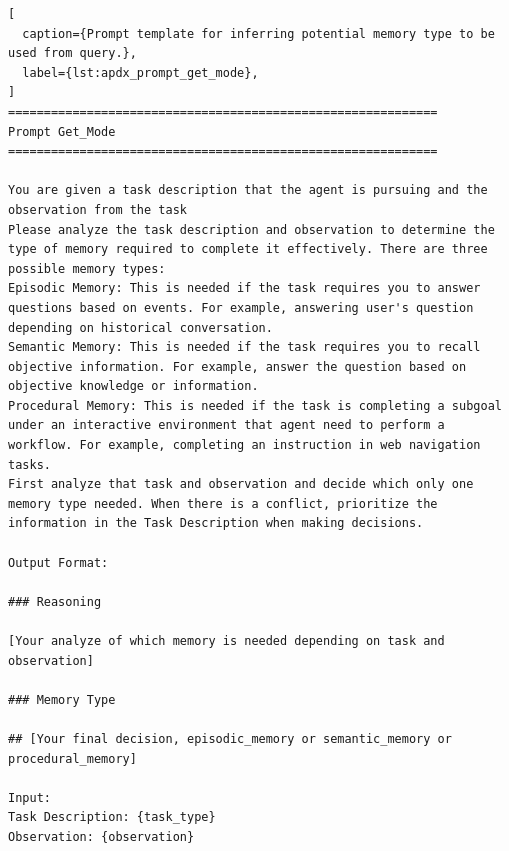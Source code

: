 \begin{lstlisting}[
  caption={Prompt template for inferring potential memory type to be used from query.},
  label={lst:apdx_prompt_get_mode},
]
============================================================
Prompt Get_Mode
============================================================

You are given a task description that the agent is pursuing and the observation from the task
Please analyze the task description and observation to determine the type of memory required to complete it effectively. There are three possible memory types:
Episodic Memory: This is needed if the task requires you to answer questions based on events. For example, answering user's question depending on historical conversation.
Semantic Memory: This is needed if the task requires you to recall objective information. For example, answer the question based on objective knowledge or information.
Procedural Memory: This is needed if the task is completing a subgoal under an interactive environment that agent need to perform a workflow. For example, completing an instruction in web navigation tasks.
First analyze that task and observation and decide which only one memory type needed. When there is a conflict, prioritize the information in the Task Description when making decisions.

Output Format:

### Reasoning

[Your analyze of which memory is needed depending on task and observation]

### Memory Type

## [Your final decision, episodic_memory or semantic_memory or procedural_memory]

Input:
Task Description: {task_type}
Observation: {observation}
\end{lstlisting}
